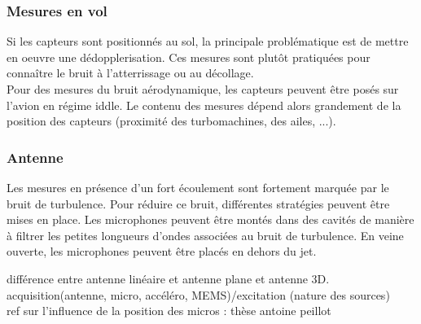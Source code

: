 \subsubsection{Mesures en vol}
Si les capteurs sont positionnés au sol, la principale problématique est de mettre en oeuvre une dédopplerisation. Ces mesures sont plutôt pratiquées pour connaître le bruit à l’atterrissage ou au décollage.\\
Pour des mesures du bruit aérodynamique, les capteurs peuvent être posés sur l'avion en régime iddle. Le contenu des mesures dépend alors grandement de la position des capteurs (proximité des turbomachines, des ailes, ...).



\subsubsection{Antenne}
Les mesures en présence d'un fort écoulement sont fortement marquée par le bruit de turbulence. Pour réduire ce bruit, différentes stratégies peuvent être mises en place. Les microphones peuvent être montés dans des cavités de manière à filtrer les petites longueurs d'ondes associées au bruit de turbulence. En veine ouverte, les microphones peuvent être placés en dehors du jet.  


différence entre antenne linéaire et antenne plane et antenne 3D.\\

acquisition(antenne, micro, accéléro, MEMS)/excitation (nature des sources)\\

ref sur l'influence de la position des micros : thèse antoine peillot\\






